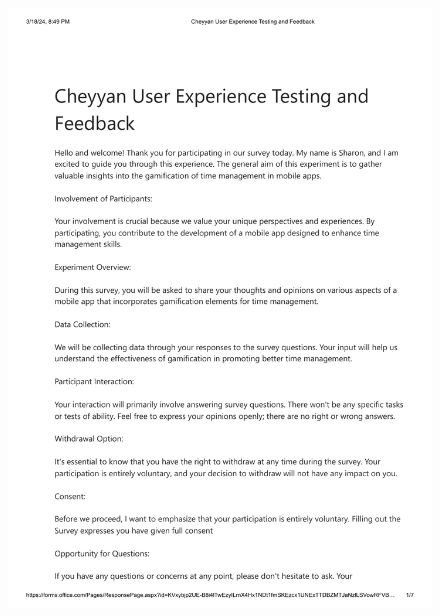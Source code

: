 \documentclass{l4proj}
\begin{document}
\begin{appendices}
\begin{figure}[h]
    \centering
    \includegraphics[height=20cm]{images/Cheyyan User Experience Testing and Feedback-1.png}
\end{figure}


\end{appendices}
\end{document}
